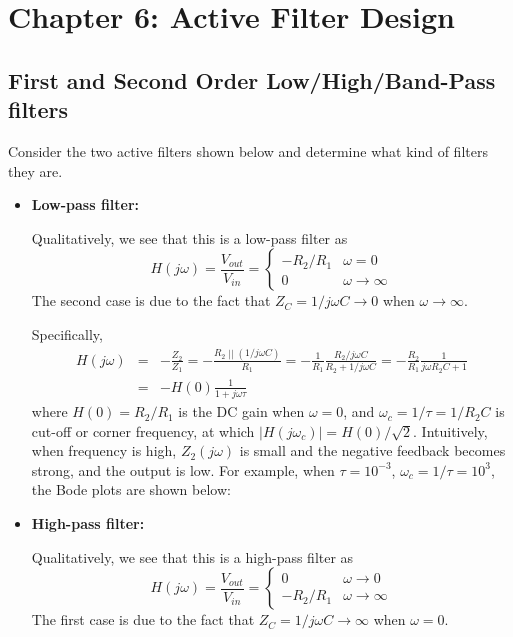 \documentclass{article}
\begin{document}
\section*{Chapter 6: Active Filter Design}

\subsection{First and Second Order Low/High/Band-Pass filters}


Consider the two active filters shown below and determine what kind
of filters they are. 

\begin{itemize}
\item {\bf Low-pass filter:}

  Qualitatively, we see that this is a low-pass filter as
  \begin{equation}
    H(j\omega)=\frac{V_{out}}{V_{in}}=\left\{\begin{array}{ll}
    -R_2/R_1 & \omega=0\\ 0 & \omega\rightarrow\infty \end{array}\right.
  \end{equation}
  The second case is due to the fact that $Z_C=1/j\omega C\rightarrow 0$
  when $\omega\rightarrow\infty$.
  
  Specifically,
  \begin{eqnarray}
    H(j\omega)&=&-\frac{Z_2}{Z_1}=-\frac{R_2\;||\;(1/j\omega C)}{R_1}
    =-\frac{1}{R_1}\frac{R_2/j\omega C}{R_2+1/j\omega C}
    =-\frac{R_2}{R_1}\frac{1}{j\omega R_2C+1}
    \nonumber \\
    &=&-H(0)\frac{1}{1+j\omega \tau}
  \end{eqnarray}
  where $H(0)=R_2/R_1$ is the DC gain when $\omega=0$, and
  $\omega_c=1/\tau=1/R_2C$ is cut-off or corner frequency, at which 
  $|H(j\omega_c)|=H(0)/\sqrt{2}$. Intuitively, when frequency is high, 
  $Z_2(j\omega)$ is small and the negative feedback becomes strong,
  and the output is low. For example, when
  $\tau=10^{-3}$, $\omega_c=1/\tau=10^3$, the Bode plots are shown  
  below:


\item {\bf High-pass filter:}

  Qualitatively, we see that this is a high-pass filter as
  \begin{equation}
    H(j\omega)=\frac{V_{out}}{V_{in}}=\left\{\begin{array}{ll}
    0 & \omega\rightarrow 0\\ -R_2/R_1 & \omega\rightarrow\infty
    \end{array}\right.
  \end{equation}
  The first case is due to the fact that $Z_C=1/j\omega C\rightarrow\infty$
  when $\omega=0$.


\end{itemize}
\end{document}
